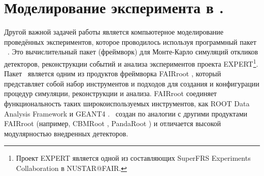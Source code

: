 \section{Моделирование эксперимента в \er.}
\label{section:simulations}

Другой важной задачей работы является компьютерное моделирование проведённых экспериментов, которое проводилось используя программный пакет \er\ \cite{er}.
Это вычислительный пакет (фреймворк) для Монте-Карло симуляций откликов детекторов, реконструкции событий и анализа экспериментов проекта EXPERT\footnote{Проект EXPERT является одной из составляющих SuperFRS Experiments Collaboration в NUSTAR@FAIR.}.
Пакет \er\ является одним из продуктов фреймворка FAIRroot \cite{FAIRroot}, который представляет собой набор инструментов и подходов для создания и конфигурации процедур симуляции, реконструкции и анализа. FAIRroot соединяет функциональность таких широкоиспользуемых инструментов, как ROOT Data Analysis Framework \cite{root} и GEANT4 \cite{geant}.
\er\ создан по аналогии с другими продуктами FAIRroot (например, CBMRoot \cite{CBMroot}, PandaRoot \cite{PANDAroot}) и отличается высокой модулярностью внедренных детекторов.

